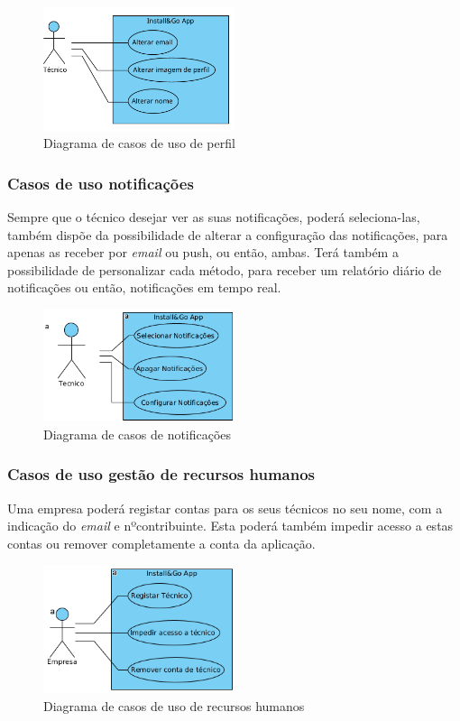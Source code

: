 \begin{figure}[htb]
  \centering
  
  \includegraphics[width=0.5\textwidth]{images/diagramas/casos_de_uso/use_case_perfil.png}
  \caption{Diagrama de casos de uso de perfil}
  \label{fig:17}
\end{figure}

\newpage

\subsubsection{Casos de uso notificações}

Sempre que o técnico desejar ver as suas notificações, poderá seleciona-las, também dispõe da possibilidade de alterar a configuração das notificações, para apenas as receber por \textit{email} ou push, ou então, ambas. Terá também a possibilidade de personalizar cada método, para receber um relatório diário de notificações ou então, notificações em tempo real.

\begin{figure}[htb]
  \centering
  \includegraphics[width=0.5\textwidth]{images/diagramas/casos_de_uso/use_case_notificacoes.png}
  \caption{Diagrama de casos de notificações}
  \label{fig:18}
\end{figure}

\subsubsection{Casos de uso gestão de recursos humanos}

Uma empresa poderá registar contas para os seus técnicos no seu nome, com a indicação do \textit{email} e nºcontribuinte. Esta poderá também impedir acesso a estas contas ou remover completamente a conta da aplicação.

\begin{figure}[htb]
  \centering
  \includegraphics[width=0.5\textwidth]{images/diagramas/casos_de_uso/use_case_rec_humanos.png}
  \caption{Diagrama de casos de uso de recursos humanos}
  \label{fig:19}
\end{figure}
